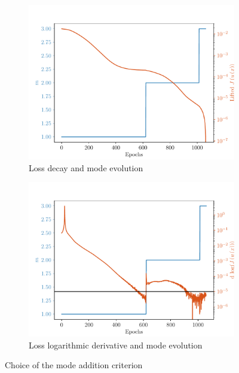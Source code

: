 \begin{figure}
	\begin{subfigure}[t]{0.5\linewidth}
		\centering
		\includegraphics[width=\linewidth]{Figures/Loss_Modes.pdf}
		\caption{Loss decay and mode evolution}
	\end{subfigure}
	\begin{subfigure}[t]{0.5\linewidth}
		\centering
		\includegraphics[width=\linewidth]{Figures/LossDecay_Modes.pdf}
		\caption{Loss logarithmic derivative and mode evolution}
	\end{subfigure}  
	\caption{Choice of the mode addition criterion}
	\label{fig:Criterion_mode}
\end{figure}

